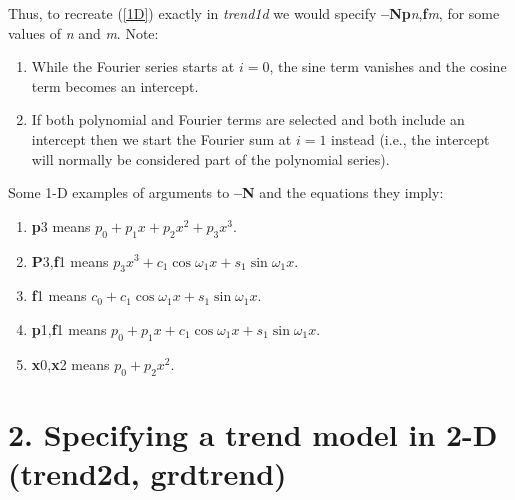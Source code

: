 \documentclass[12pt,letterpaper,margin=0.5in]{report}
\begin{document}
Thus, to recreate (\ref{1D}) exactly in {\it trend1d} we would specify {\bf --Np}{\it n},{\bf f}{\it m}, for some values of {\it n} and {\it m}.  Note:
\begin{enumerate}
	\item While the Fourier series starts at $i = 0$, the sine term vanishes and the cosine term becomes an intercept.
	\item If both polynomial and Fourier terms are selected and both include an intercept then we start the Fourier sum at $i = 1$ instead (i.e., the intercept will normally be considered part of the polynomial series).
\end{enumerate}
Some 1-D examples of arguments to {\bf --N} and the equations they imply:
\begin{enumerate}
	\item {\bf p}3 means $p_0 + p_1x + p_2x^2 + p_3x^3$.
	\item {\bf P}3,{\bf f}1 means $p_3x^3 + c_1\cos \omega_1 x + s_1 \sin \omega_1 x$.
	\item {\bf f}1 means $c_0 + c_1\cos \omega_1 x + s_1 \sin \omega_1 x$.
	\item {\bf p}1,{\bf f}1 means $p_0 + p_1x + c_1\cos \omega_1 x + s_1 \sin \omega_1 x$.
	\item {\bf x}0,{\bf x}2 means $p_0 + p_2x^2$.
\end{enumerate}

\section*{2. Specifying a trend model in 2-D (trend2d, grdtrend)}
\end{document}
